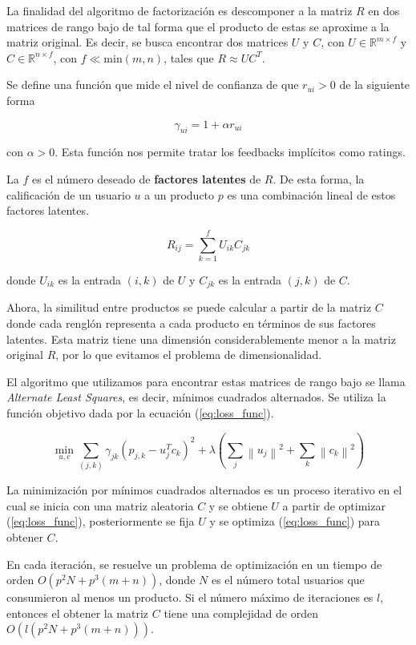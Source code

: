 \documentclass[conference]{IEEEtran}
\newcommand{\norm}[1]{\left\lVert#1\right\rVert}
\begin{document}
La finalidad del algoritmo de factorización es descomponer a la matriz $R$ en dos matrices de rango bajo de tal forma que el producto de estas se aproxime a la matriz original. Es decir, se busca encontrar dos matrices $U$ y $C$, con $U \in \mathbb{R}^{m \times f}$ y $C \in \mathbb{R}^{n \times f}$, con $f \ll \mathrm{min}(m, n)$, tales que $R \approx UC^T$.

Se define una función que mide el nivel de confianza de que $r_{ui} > 0$ de la siguiente forma

\[
    \gamma_{ui} = 1 + \alpha r_{ui}
\]

con $\alpha > 0$. Esta función nos permite tratar los feedbacks implícitos como ratings.

La $f$ es el número deseado de \textbf{factores latentes} de $R$. De esta forma, la calificación de un usuario $u$ a un producto $p$ es una combinación lineal de estos factores latentes.

\[
    R_{ij} = \sum_{k = 1}^f U_{ik} C_{jk}
\]

donde $U_{ik}$ es la entrada $(i, k)$ de $U$ y $C_{jk}$ es la entrada $(j, k)$ de $C$.

Ahora, la similitud entre productos se puede calcular a partir de la matriz $C$ donde cada renglón representa a cada producto en términos de sus factores latentes. Esta matriz tiene una dimensión considerablemente menor a la matriz original $R$, por lo que evitamos el problema de dimensionalidad.

El algoritmo que utilizamos para encontrar estas matrices de rango bajo se llama \textit{Alternate Least Squares}, es decir, mínimos cuadrados alternados. Se utiliza la función objetivo dada por la ecuación (\ref{eq:loss_func}).

\begin{equation}
    \label{eq:loss_func}
    \min_{u, c} \sum_{(j, k)} \gamma_{jk} \left( p_{j, k} - u_j^T c_k \right)^2 + \lambda \left( \sum_j \norm{u_j}^2 + \sum_k \norm{c_k}^2 \right) 
\end{equation}

La minimización por mínimos cuadrados alternados es un proceso iterativo en el cual se inicia con una matriz aleatoria $C$ y se obtiene $U$ a partir de optimizar (\ref{eq:loss_func}), posteriormente se fija $U$ y se optimiza (\ref{eq:loss_func}) para obtener $C$.

En cada iteración, se resuelve un problema de optimización en un tiempo de orden $O(p^2N + p^3 (m + n))$, donde $N$ es el número total usuarios que consumieron al menos un producto. Si el número máximo de iteraciones es $l$, entonces el obtener la matriz $C$ tiene una complejidad de orden $O(l (p^2N + p^3 (m + n)))$.
\end{document}
